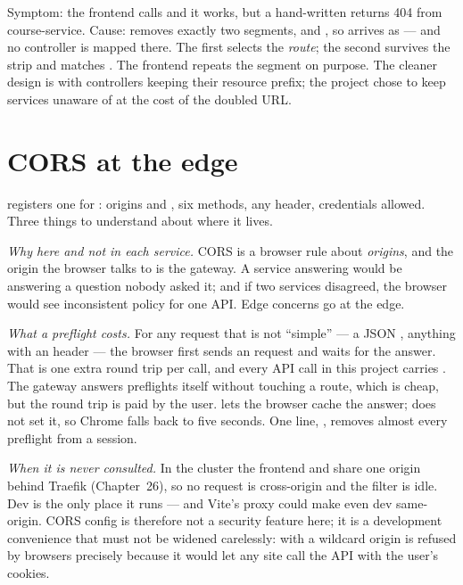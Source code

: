 \begin{pitfall}
Symptom: the frontend calls  and it
works, but a hand-written  returns 404 from
course-service. Cause:  removes exactly two
segments,  and , so 
arrives as  --- and no controller is mapped there. The first
 selects the \emph{route}; the second survives the strip
and matches . The frontend repeats the
segment on purpose. The cleaner design is  with
controllers keeping their resource prefix; the project chose to keep
services unaware of  at the cost of the doubled URL.
\end{pitfall}

\section{CORS at the edge}

 registers one  for \code{/**}:
origins  and , six methods, any header,
credentials allowed. Three things to understand about where it lives.

\emph{Why here and not in each service.} CORS is a browser rule about
\emph{origins}, and the origin the browser talks to is the gateway.
A service answering  would be
answering a question nobody asked it; and if two services disagreed, the
browser would see inconsistent policy for one API. Edge concerns go at
the edge.

\emph{What a preflight costs.} For any request that is not ``simple''
--- a JSON , anything with an  header ---
the browser first sends an  request and waits for the
answer. That is one extra round trip per call, and every API call in
this project carries . The gateway answers preflights
itself without touching a route, which is cheap, but the round trip is
paid by the user.  lets the browser cache
the answer;  does not set it, so Chrome falls back to
five seconds. One line, , removes almost
every preflight from a session.

\emph{When it is never consulted.} In the cluster the frontend and
 share one origin behind Traefik (Chapter~26), so no request
is cross-origin and the filter is idle. Dev is the only place it runs
--- and Vite's proxy could make even dev same-origin. CORS config is
therefore not a security feature here; it is a development convenience
that must not be widened carelessly:  with
a wildcard origin is refused by browsers precisely because it would let
any site call the API with the user's cookies.

